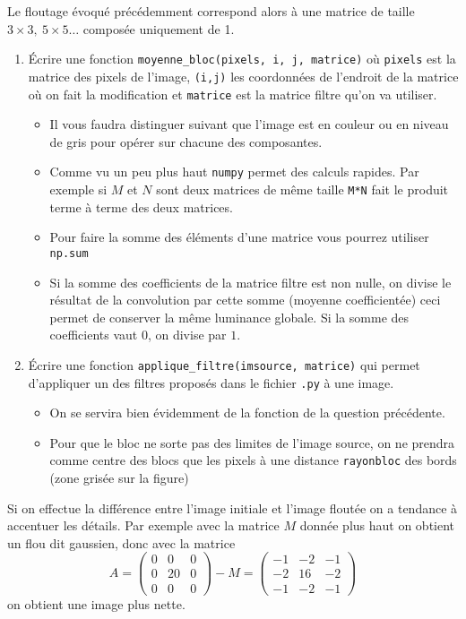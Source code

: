 \documentclass[10pt,a4paper,pdftex]{book}
\begin{document}
\smallskip
Le floutage évoqué précédemment correspond alors à une matrice de taille $3\times 3,\ 5\times 5\ldots$ composée uniquement de 1.


\begin{exoc}{}
\begin{enumerate}
\item Écrire une fonction \verb+moyenne_bloc(pixels, i, j, matrice)+ où \texttt{pixels} est la matrice des pixels de l'image, \texttt{(i,j)} les coordonnées de l'endroit de la matrice où on fait la modification et \texttt{matrice} est la matrice filtre qu'on va utiliser.

\smallskip
\begin{itemize}
\item Il vous faudra distinguer suivant que l'image est en couleur ou en niveau de gris pour opérer sur chacune des composantes.
\item Comme vu un peu plus haut \texttt{numpy} permet des calculs rapides. Par exemple si $M$ et $N$ sont deux matrices de même taille \texttt{M*N} fait le produit terme à terme des deux matrices.
\item Pour faire la somme des éléments d'une matrice vous pourrez utiliser \texttt{np.sum}
\item Si la somme des coefficients de la matrice filtre est non nulle,  on divise le résultat de la convolution par cette somme (moyenne coefficientée) ceci permet de conserver la même luminance globale. Si la somme des coefficients vaut $0$, on divise par $1$.
\end{itemize}
\item Écrire une fonction \verb+applique_filtre(imsource, matrice)+ qui permet d'appliquer un des filtres proposés dans le fichier \texttt{.py} à une image. 

\smallskip
\begin{itemize}
\item On se servira bien évidemment de la fonction de la question précédente.
\item Pour que le bloc ne sorte pas des limites de l'image source, on ne prendra comme centre des blocs que les pixels à une distance \texttt{rayonbloc} des bords (zone grisée sur la figure)
\end{itemize}

\end{enumerate}
\end{exoc}

\Rq Si on effectue la différence entre l'image initiale et l'image floutée on a tendance à accentuer les détails. Par exemple avec la matrice $M$ donnée plus haut on obtient un flou dit gaussien, donc avec la matrice 
$$A=\begin{pmatrix}
0&0&0\\0&20&0\\0&0&0
\end{pmatrix}-M=\begin{pmatrix}
-1&-2&-1\\-2&16&-2\\-1&-2&-1
\end{pmatrix}$$
on obtient une image \og plus nette\fg.
\end{document}
